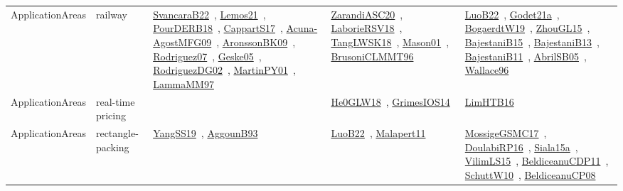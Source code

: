 {\begin{longtable}{lp{3cm}>{\raggedright\arraybackslash}p{6cm}>{\raggedright\arraybackslash}p{6cm}>{\raggedright\arraybackslash}p{8cm}}
ApplicationAreas & railway & \href{works/SvancaraB22.pdf}{SvancaraB22}~\cite{SvancaraB22}, \href{works/Lemos21.pdf}{Lemos21}~\cite{Lemos21}, \href{works/PourDERB18.pdf}{PourDERB18}~\cite{PourDERB18}, \href{works/CappartS17.pdf}{CappartS17}~\cite{CappartS17}, \href{works/Acuna-AgostMFG09.pdf}{Acuna-AgostMFG09}~\cite{Acuna-AgostMFG09}, \href{works/AronssonBK09.pdf}{AronssonBK09}~\cite{AronssonBK09}, \href{works/Rodriguez07.pdf}{Rodriguez07}~\cite{Rodriguez07}, \href{works/Geske05.pdf}{Geske05}~\cite{Geske05}, \href{works/RodriguezDG02.pdf}{RodriguezDG02}~\cite{RodriguezDG02}, \href{works/MartinPY01.pdf}{MartinPY01}~\cite{MartinPY01}, \href{works/LammaMM97.pdf}{LammaMM97}~\cite{LammaMM97} & \href{works/ZarandiASC20.pdf}{ZarandiASC20}~\cite{ZarandiASC20}, \href{works/LaborieRSV18.pdf}{LaborieRSV18}~\cite{LaborieRSV18}, \href{works/TangLWSK18.pdf}{TangLWSK18}~\cite{TangLWSK18}, \href{works/Mason01.pdf}{Mason01}~\cite{Mason01}, \href{works/BrusoniCLMMT96.pdf}{BrusoniCLMMT96}~\cite{BrusoniCLMMT96} & \href{works/LuoB22.pdf}{LuoB22}~\cite{LuoB22}, \href{works/Godet21a.pdf}{Godet21a}~\cite{Godet21a}, \href{works/BogaerdtW19.pdf}{BogaerdtW19}~\cite{BogaerdtW19}, \href{works/ZhouGL15.pdf}{ZhouGL15}~\cite{ZhouGL15}, \href{works/BajestaniB15.pdf}{BajestaniB15}~\cite{BajestaniB15}, \href{works/BajestaniB13.pdf}{BajestaniB13}~\cite{BajestaniB13}, \href{works/BajestaniB11.pdf}{BajestaniB11}~\cite{BajestaniB11}, \href{works/AbrilSB05.pdf}{AbrilSB05}~\cite{AbrilSB05}, \href{works/Wallace96.pdf}{Wallace96}~\cite{Wallace96}\\
ApplicationAreas & real-time pricing &  & \href{works/He0GLW18.pdf}{He0GLW18}~\cite{He0GLW18}, \href{works/GrimesIOS14.pdf}{GrimesIOS14}~\cite{GrimesIOS14} & \href{works/LimHTB16.pdf}{LimHTB16}~\cite{LimHTB16}\\
ApplicationAreas & rectangle-packing & \href{works/YangSS19.pdf}{YangSS19}~\cite{YangSS19}, \href{works/AggounB93.pdf}{AggounB93}~\cite{AggounB93} & \href{works/LuoB22.pdf}{LuoB22}~\cite{LuoB22}, \href{works/Malapert11.pdf}{Malapert11}~\cite{Malapert11} & \href{works/MossigeGSMC17.pdf}{MossigeGSMC17}~\cite{MossigeGSMC17}, \href{works/DoulabiRP16.pdf}{DoulabiRP16}~\cite{DoulabiRP16}, \href{works/Siala15a.pdf}{Siala15a}~\cite{Siala15a}, \href{works/VilimLS15.pdf}{VilimLS15}~\cite{VilimLS15}, \href{works/BeldiceanuCDP11.pdf}{BeldiceanuCDP11}~\cite{BeldiceanuCDP11}, \href{works/SchuttW10.pdf}{SchuttW10}~\cite{SchuttW10}, \href{works/BeldiceanuCP08.pdf}{BeldiceanuCP08}~\cite{BeldiceanuCP08}\\

\end{longtable}}
